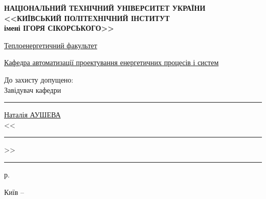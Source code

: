\thispagestyle{empty}

\begin{center}
\textbf{НАЦІОНАЛЬНИЙ ТЕХНІЧНИЙ УНІВЕРСИТЕТ УКРАЇНИ \\
<<КИЇВСЬКИЙ ПОЛІТЕХНІЧНИЙ ІНСТИТУТ \\
імені ІГОРЯ СІКОРСЬКОГО>>}

\vspace{0.5ex}

\underline{Теплоенергетичний факультет}

\vspace{1ex}

\underline{Кафедра автоматизації проектування енергетичних процесів і систем}
\end{center}

\begin{flushright}
До захисту допущено: \\
Завідувач кафедри \\
\rule{8ex}{0.2mm} \underline{Наталія АУШЕВА} \\
<<\rule{3ex}{0.2mm}>>\rule{13ex}{0.2mm} \the\year{} р.
\end{flushright}

\vfill

\begin{center}
Київ – \the\year{}
\end{center}